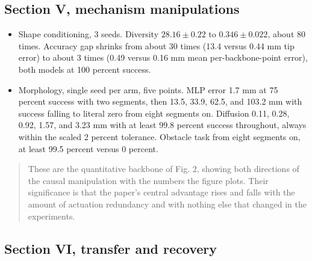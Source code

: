 \documentclass[11pt]{article}
\newcommand{\desc}[1]{\begin{quote}\small #1\end{quote}}
\begin{document}
\subsection*{Section V, mechanism manipulations}

\begin{itemize}
\item Shape conditioning, 3 seeds. Diversity $28.16\pm0.22$ to
$0.346\pm0.022$, about 80 times. Accuracy gap shrinks from about 30 times
(13.4 versus 0.44 mm tip error) to about 3 times (0.49 versus 0.16 mm mean
per-backbone-point error), both models at 100 percent success.
\item Morphology, single seed per arm, five points. MLP error 1.7 mm at 75
percent success with two segments, then 13.5, 33.9, 62.5, and 103.2 mm with
success falling to literal zero from eight segments on. Diffusion 0.11,
0.28, 0.92, 1.57, and 3.23 mm with at least 99.8 percent success
throughout, always within the scaled 2 percent tolerance. Obstacle task
from eight segments on, at least 99.5 percent versus 0 percent.
\end{itemize}

\desc{These are the quantitative backbone of Fig. 2, showing both directions
of the causal manipulation with the numbers the figure plots. Their
significance is that the paper's central advantage rises and falls with the
amount of actuation redundancy and with nothing else that changed in the
experiments.}

\subsection*{Section VI, transfer and recovery}
\end{document}
